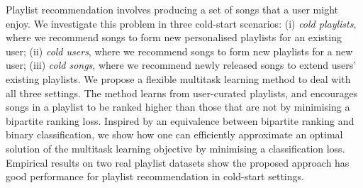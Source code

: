 
Playlist recommendation involves producing a set of songs that a user might enjoy.
We investigate this problem in three %
cold-start scenarios:
(i) \emph{cold playlists}, 
where we recommend songs to form new personalised playlists for an existing user;
(ii) \emph{cold users},
where we recommend songs to form new playlists for a new user;
(iii) \emph{cold songs}, where we recommend newly released songs to extend users' existing playlists.
%
We propose a flexible multitask learning method to deal with all three settings.
The method learns from user-curated playlists,
and encourages songs in a playlist 
to be ranked higher than those that are not
by minimising a %
bipartite ranking loss.
Inspired by an equivalence between bipartite ranking and binary classification,
we show how one can efficiently approximate an optimal solution of the multitask learning objective by 
minimising a classification loss.
%
Empirical results on two real playlist datasets show the proposed approach has good performance 
for playlist recommendation in cold-start settings.
%
